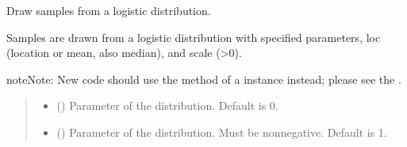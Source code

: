 \documentclass[letterpaper,10pt,english]{sphinxmanual}
\begin{document}
\begin{fulllineitems}
\label{\detokenize{metilda.controllers:metilda.controllers.pitch_art_wizard.logistic}}
\pysigstartsignatures
{}
\pysigstopsignatures
\sphinxAtStartPar
Draw samples from a logistic distribution.

\sphinxAtStartPar
Samples are drawn from a logistic distribution with specified
parameters, loc (location or mean, also median), and scale (\textgreater{}0).

\begin{sphinxadmonition}{note}{Note:}
\sphinxAtStartPar
New code should use the 
method of a  instance instead;
please see the .
\end{sphinxadmonition}
\begin{quote}\begin{description}
\begin{itemize}
\item {} 
\sphinxAtStartPar
{} (\sphinxstyleliteralemphasis{\sphinxupquote{, }}) \textendash{} Parameter of the distribution. Default is 0.

\item {} 
\sphinxAtStartPar
{} (\sphinxstyleliteralemphasis{\sphinxupquote{, }}) \textendash{} Parameter of the distribution. Must be non\sphinxhyphen{}negative.
Default is 1.


\end{itemize}
\end{description}
\end{quote}
\end{fulllineitems}
\end{document}
